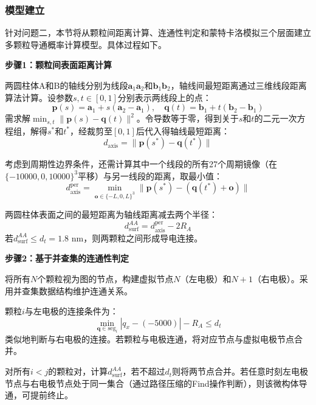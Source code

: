 
\subsubsection{模型建立}

针对问题二，本节将从颗粒间距离计算、连通性判定和蒙特卡洛模拟三个层面建立多颗粒导通概率计算模型。具体过程如下。

\textbf{步骤1：颗粒间表面距离计算}

两圆柱体A和B的轴线分别为线段$\mathbf{a}_1\mathbf{a}_2$和$\mathbf{b}_1\mathbf{b}_2$，轴线间最短距离通过三维线段距离算法计算。设参数$s, t \in [0,1]$分别表示两线段上的点：
\begin{equation}
\mathbf{p}(s) = \mathbf{a}_1 + s(\mathbf{a}_2 - \mathbf{a}_1), \quad \mathbf{q}(t) = \mathbf{b}_1 + t(\mathbf{b}_2 - \mathbf{b}_1)
\end{equation}
需求解$\min_{s,t} \|\mathbf{p}(s) - \mathbf{q}(t)\|^2$。令导数等于零，得到关于$s$和$t$的二元一次方程组，解得$s^*$和$t^*$，经裁剪至$[0,1]$后代入得轴线最短距离：
\begin{equation}
d_{\text{axis}} = \|\mathbf{p}(s^*) - \mathbf{q}(t^*)\|
\end{equation}

考虑到周期性边界条件，还需计算其中一个线段的所有27个周期镜像（在$\{-10000, 0, 10000\}^3$平移）与另一线段的距离，取最小值：
\begin{equation}
d_{\text{axis}}^{\text{per}} = \min_{\mathbf{o} \in \{-L,0,L\}^3} \|\mathbf{p}(s^*) - (\mathbf{q}(t^*) + \mathbf{o})\|
\end{equation}

两圆柱体表面之间的最短距离为轴线距离减去两个半径：
\begin{equation}
d_{\text{surf}}^{AA} = d_{\text{axis}}^{\text{per}} - 2R_A
\end{equation}
若$d_{\text{surf}}^{AA} \leq d_t = 1.8$ nm，则两颗粒之间形成导电连接。

\textbf{步骤2：基于并查集的连通性判定}

将所有$N$个颗粒视为图的节点，构建虚拟节点$N$（左电极）和$N+1$（右电极）。采用并查集数据结构维护连通关系。

颗粒$i$与左电极的连接条件为：
\begin{equation}
\min_{\mathbf{q} \in \text{seg}_i} |q_x - (-5000)| - R_A \leq d_t
\end{equation}
类似地判断与右电极的连接。若颗粒与电极连通，将对应节点与虚拟电极节点合并。

对所有$i<j$的颗粒对，计算$d_{\text{surf}}^{AA}$，若不超过$d_t$则将两节点合并。若任意时刻左电极节点与右电极节点处于同一集合（通过路径压缩的Find操作判断），则该微构体导通，可提前终止。

